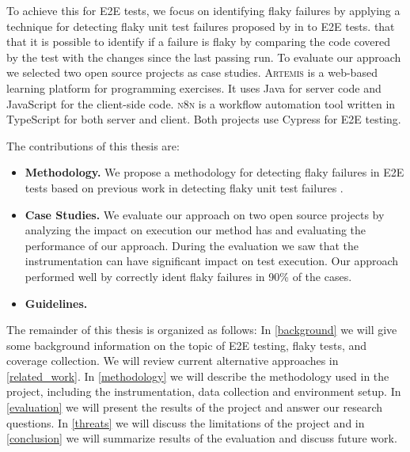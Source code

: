 To achieve this for \ac{E2E} tests, we focus on identifying flaky failures by applying a technique for detecting flaky unit test failures proposed by \citeauthor*{bell_deflaker_2018} in  \autocite{bell_deflaker_2018} to \ac{E2E} tests.  that that it is possible to identify if a failure is flaky by comparing the code covered by the test with the changes since the last passing run. To evaluate our approach we selected two open source projects as case studies. \textsc{Artemis} \autocite{krusche_artemis_2018} is a web-based learning platform for programming exercises. It uses Java for server code and JavaScript for the client-side code. \textsc{n8n} \autocite{noauthor_n8n_2023} is a workflow automation tool written in TypeScript for both server and client. Both projects use Cypress \autocite{noauthor_cypress-iocypress_2023} for \ac{E2E} testing.

The contributions of this thesis are:
\begin{itemize}
	\item \textbf{Methodology.} We propose a methodology for detecting flaky failures in \ac{E2E} tests based on previous work in detecting flaky unit test failures \autocite{bell_deflaker_2018}.
	\item \textbf{Case Studies.} We evaluate our approach on two open source projects by analyzing the impact on execution our method has and evaluating the performance of our approach. During the evaluation we saw that the instrumentation can have significant impact on test execution. Our approach performed well by correctly ident flaky failures in 90\% of the cases.
	\item \textbf{Guidelines.} 
\end{itemize}

The remainder of this thesis is organized as follows:
In \cref{background} we will give some background information on the topic of \ac{E2E} testing, flaky tests, and coverage collection.
We will review current alternative approaches in \cref{related_work}.
In \cref{methodology} we will describe the methodology used in the project, including the instrumentation, data collection and environment setup.
In \cref{evaluation} we will present the results of the project and answer our research questions.
In \cref{threats} we will discuss the limitations of the project and in \cref{conclusion} we will summarize results of the evaluation and discuss future work.



